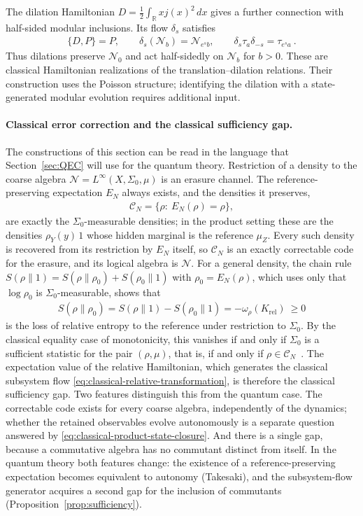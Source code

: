 \documentclass[a4paper,11pt]{article}
\theoremstyle{definition}
\begin{document}
The dilation Hamiltonian $D=\frac12\int_{\mathbb R}xj(x)^2\,dx$ gives a further connection with half-sided modular inclusions. Its flow $\delta_s$ satisfies
\begin{align}
    \{D,P\}=P,
    \qquad \delta_s(\mathcal N_b)=\mathcal N_{e^s b},
    \qquad \delta_s\tau_a\delta_{-s}=\tau_{e^s a}\ .
\end{align}
Thus dilations preserve $\mathcal N_0$ and act half-sidedly on $\mathcal N_b$ for $b>0$. These are classical Hamiltonian realizations of the translation--dilation relations. Their construction uses the Poisson structure; identifying the dilation with a state-generated modular evolution requires additional input.

\paragraph{Classical error correction and the classical sufficiency gap.}
The constructions of this section can be read in the language that Section~\ref{sec:QEC} will use for the quantum theory. Restriction of a density to the coarse algebra $\mathcal N=L^\infty(X,\Sigma_0,\mu)$ is an erasure channel. The reference-preserving expectation $E_N$ always exists, and the densities it preserves,
\begin{align}
 \mathcal C_N=\{\rho:\ E_N(\rho)=\rho\},
\end{align}
are exactly the $\Sigma_0$-measurable densities; in the product setting these are the densities $\rho_Y(y)\,1$ whose hidden marginal is the reference $\mu_Z$. Every such density is recovered from its restriction by $E_N$ itself, so $\mathcal C_N$ is an exactly correctable code for the erasure, and its logical algebra is $\mathcal N$. For a general density, the chain rule $S(\rho\|1)=S(\rho\|\rho_0)+S(\rho_0\|1)$ with $\rho_0=E_N(\rho)$, which uses only that $\log\rho_0$ is $\Sigma_0$-measurable, shows that
\begin{align}\label{eq:classical-sufficiency-gap}
 S(\rho\|\rho_0)=S(\rho\|1)-S(\rho_0\|1)=-\omega_\rho(K_{\mathrm{rel}})\ \ge0
\end{align}
is the loss of relative entropy to the reference under restriction to $\Sigma_0$. By the classical equality case of monotonicity, this vanishes if and only if $\Sigma_0$ is a sufficient statistic for the pair $(\rho,\mu)$, that is, if and only if $\rho\in\mathcal C_N$~\cite{OhyaPetz1993}. The expectation value of the relative Hamiltonian, which generates the classical subsystem flow \eqref{eq:classical-relative-transformation}, is therefore the classical sufficiency gap. Two features distinguish this from the quantum case. The correctable code exists for every coarse algebra, independently of the dynamics; whether the retained observables evolve autonomously is a separate question answered by \eqref{eq:classical-product-state-closure}. And there is a single gap, because a commutative algebra has no commutant distinct from itself. In the quantum theory both features change: the existence of a reference-preserving expectation becomes equivalent to autonomy (Takesaki), and the subsystem-flow generator acquires a second gap for the inclusion of commutants (Proposition~\ref{prop:sufficiency}).
\end{document}
